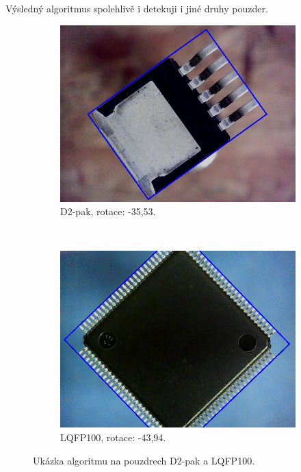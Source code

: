 Výsledný algoritmus spolehlivě i detekuji i jiné druhy pouzder.


\begin{figure}[h!]
	\centering
	\begin{subfigure}[b]{0.48\linewidth}
		\centering
		\includegraphics[width=1\linewidth]{obrazky/D2pack2.png}%
		\caption{D2-pak, rotace: -35,53\textdegree.}
		\label{fig:rotD2}
	\end{subfigure}
	~
	\begin{subfigure}[b]{0.48\linewidth}
		\centering
		\includegraphics[width=1\linewidth]{obrazky/IC.png}%
		\caption{LQFP100, rotace: -43,94\textdegree.}
		\label{fig:rotIC}
	\end{subfigure}

	\caption{Ukázka algoritmu na pouzdrech D2-pak a LQFP100.}
\end{figure}





